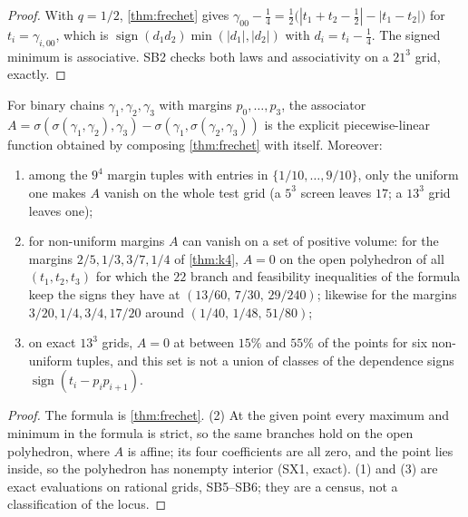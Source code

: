 \documentclass[11pt]{article}
\theoremstyle{definition}\newtheorem{definition}[theorem]{Definition}\newtheorem{remark}[theorem]{Remark}\newtheorem{example}[theorem]{Example}\newtheorem{problem}[theorem]{Open problem}\crefname{problem}{Problem}{Problems}
\begin{document}
\begin{proof}
With $q=1/2$, \cref{thm:frechet} gives $\gamma_{00}-\tfrac14=\tfrac12\bigl(|t_1+t_2-\tfrac12|-|t_1-t_2|\bigr)$ for $t_i=\gamma_{i,00}$, which is $\operatorname{sign}(d_1d_2)\min(|d_1|,|d_2|)$ with $d_i=t_i-\tfrac14$. The signed minimum is
associative. SB2 checks both laws and associativity on a $21^3$ grid, exactly.
\end{proof}

\begin{proposition}\label{prop:assoclocus}
For binary chains $\gamma_1,\gamma_2,\gamma_3$ with margins $p_0,\dots,p_3$, the associator $A=\sigma(\sigma(\gamma_1,\gamma_2),\gamma_3)-\sigma(\gamma_1,\sigma(\gamma_2,\gamma_3))$ is the explicit piecewise-linear function obtained by composing
\cref{thm:frechet} with itself. Moreover:
\begin{enumerate}
\item[(1)] among the $9^4$ margin tuples with entries in $\{1/10,\dots,9/10\}$, only the uniform one makes $A$ vanish on the whole test grid (a $5^3$ screen leaves $17$; a $13^3$ grid leaves one);
\item[(2)] for non-uniform margins $A$ can vanish on a set of positive volume: for the margins $2/5,1/3,3/7,1/4$ of \cref{thm:k4}, $A=0$ on the open polyhedron of all $(t_1,t_2,t_3)$ for which the $22$
  branch and feasibility inequalities of the formula keep the signs they have at $(13/60,\,7/30,\,29/240)$; likewise for the margins $3/20,1/4,3/4,17/20$ around $(1/40,\,1/48,\,51/80)$;
\item[(3)] on exact $13^3$ grids, $A=0$ at between $15\%$ and $55\%$ of the points for six non-uniform tuples, and this set is not a union of classes of the dependence signs $\operatorname{sign}(t_i-p_ip_{i+1})$.
\end{enumerate}
\end{proposition}

\begin{proof}
The formula is \cref{thm:frechet}. (2) At the given point every maximum and minimum in the formula is strict, so the same branches hold on the open polyhedron, where $A$ is affine; its four coefficients
are all zero, and the point lies inside, so the polyhedron has nonempty interior (SX1, exact). (1) and (3) are exact evaluations on rational grids, SB5--SB6; they are a census, not a classification of the
locus.
\end{proof}
\end{document}
